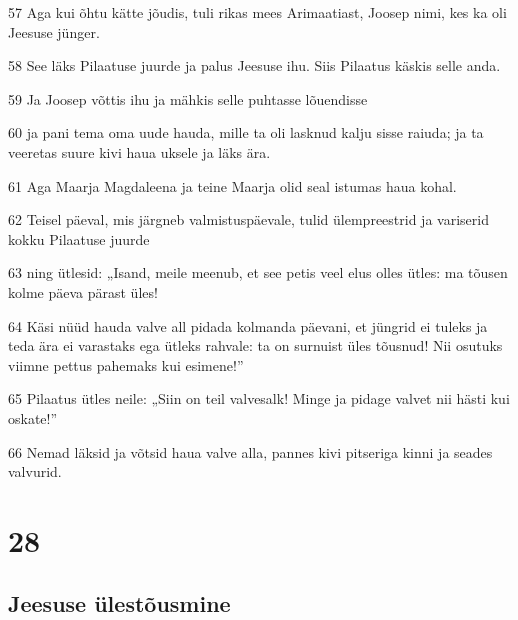 \par 57 Aga kui õhtu kätte jõudis, tuli rikas mees Arimaatiast, Joosep nimi, kes ka oli Jeesuse jünger.
\par 58 See läks Pilaatuse juurde ja palus Jeesuse ihu. Siis Pilaatus käskis selle anda.
\par 59 Ja Joosep võttis ihu ja mähkis selle puhtasse lõuendisse
\par 60 ja pani tema oma uude hauda, mille ta oli lasknud kalju sisse raiuda; ja ta veeretas suure kivi haua uksele ja läks ära.
\par 61 Aga Maarja Magdaleena ja teine Maarja olid seal istumas haua kohal.
\par 62 Teisel päeval, mis järgneb valmistuspäevale, tulid ülempreestrid ja variserid kokku Pilaatuse juurde
\par 63 ning ütlesid: „Isand, meile meenub, et see petis veel elus olles ütles: ma tõusen kolme päeva pärast üles!
\par 64 Käsi nüüd hauda valve all pidada kolmanda päevani, et jüngrid ei tuleks ja teda ära ei varastaks ega ütleks rahvale: ta on surnuist üles tõusnud! Nii osutuks viimne pettus pahemaks kui esimene!”
\par 65 Pilaatus ütles neile: „Siin on teil valvesalk! Minge ja pidage valvet nii hästi kui oskate!”
\par 66 Nemad läksid ja võtsid haua valve alla, pannes kivi pitseriga kinni ja seades valvurid.


\chapter{28}

\section*{Jeesuse ülestõusmine}

